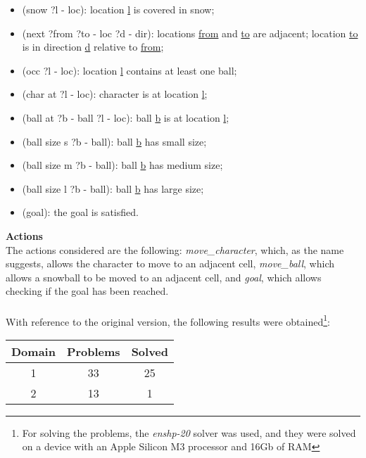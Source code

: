\documentclass{article}
\begin{document}
\begin{itemize}
    \item (snow ?l - loc): location \underline{l} is covered in snow;
\vspace{-0.15cm}
    \item (next ?from ?to - loc ?d - dir): locations
    \underline{from} and \underline{to} are adjacent;
location \underline{to} is in
    direction \underline{d} relative to \underline{from};\vspace{-0.15cm}
    \item (occ ?l - loc): location \underline{l} contains at least one ball;\vspace{-0.15cm}
    \item (char at ?l - loc): character is at location \underline{l};\vspace{-0.15cm}
    \item (ball at ?b - ball ?l - loc): ball \underline{b} is at location \underline{l};\vspace{-0.15cm}
    \item (ball size s ?b - ball): ball \underline{b} has small size;\vspace{-0.15cm}
    \item (ball size m ?b - ball): ball \underline{b} has medium size;\vspace{-0.15cm}
    \item (ball size l ?b - ball): ball 
\underline{b} has large size;\vspace{-0.15cm}
    \item (goal): the goal is satisfied.
\end{itemize}
\vspace{0.5cm}
\noindent
\textbf{Actions}\\
The actions considered are the following: \textit{move\_character}, which, as the name suggests, allows the character to move to an adjacent cell,
\textit{move\_ball}, which allows a snowball to be moved to an adjacent cell, and \textit{goal}, which allows checking if the goal has been reached.\\ \\
With reference to the original version, the following results were obtained\footnote{For solving the problems, the \textit{enshp-20} solver was used, and they were solved on a device with an Apple Silicon M3 processor and 16Gb of RAM}:
\begin{table}[H]
    \centering
    \begin{tabular}{|c|c|c|}
        \hline
    
    \textbf{Domain} & \textbf{Problems} & \textbf{Solved} \\
        \hline
        1 & 33 & 25 \\
        \hline
        2 & 13 & 1 \\
        \hline
    \end{tabular}
\end{table}
\end{document}
